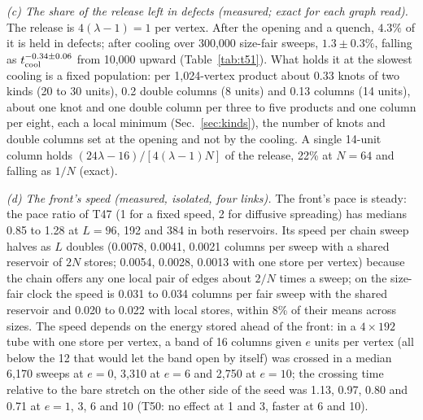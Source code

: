 \documentclass[aps,pre,10pt,twocolumn,superscriptaddress,nofootinbib]{revtex4-2}
\begin{document}
\emph{(c) The share of the release left in defects (measured; exact for each graph read).} The release is
$4(\lambda - 1) = 1$ per vertex. After the opening and a quench, $4.3\%$ of it is held in defects; after cooling
over 300,000 size-fair sweeps, $1.3 \pm 0.3\%$, falling as $t_{\rm cool}^{-0.34 \pm 0.06}$ from 10,000 upward
(Table~\ref{tab:t51}). What holds it at the slowest cooling is a fixed population: per 1,024-vertex product about
0.33 knots of two kinds (20 to 30 units), 0.2 double columns (8 units) and 0.13 columns (14 units), about one knot
and one double column per three to five products and one column per eight, each a local minimum
(Sec.~\ref{sec:kinds}), the number of knots and double columns set at the opening and not by the cooling. A single 14-unit column holds $(24\lambda - 16)/[4(\lambda - 1)N]$ of the
release, 22\% at $N = 64$ and falling as $1/N$ (exact).

\emph{(d) The front's speed (measured, isolated, four links).} The front's pace is steady: the pace ratio of T47
(1 for a fixed speed, 2 for diffusive spreading) has medians 0.85 to 1.28 at $L = 96$, 192 and 384 in both reservoirs.
Its speed per chain sweep halves as $L$ doubles (0.0078, 0.0041, 0.0021 columns per sweep with a shared reservoir
of $2N$ stores; 0.0054, 0.0028, 0.0013 with one store per vertex) because the chain offers any one local pair of
edges about $2/N$ times a sweep; on the size-fair clock the speed is 0.031 to 0.034 columns per fair sweep with the
shared reservoir and 0.020 to 0.022 with local stores, within 8\% of their means across sizes. The speed depends on
the energy stored ahead of the front: in a $4 \times 192$ tube with one store per vertex, a band of 16 columns given
$e$ units per vertex (all below the 12 that would let the band open by itself) was crossed in a median 6,170 sweeps
at $e = 0$, 3,310 at $e = 6$ and 2,750 at $e = 10$; the crossing time relative to the bare stretch on the other side
of the seed was 1.13, 0.97, 0.80 and 0.71 at $e = 1$, 3, 6 and 10 (T50: no effect at 1 and 3, faster at 6 and 10).
\end{document}
